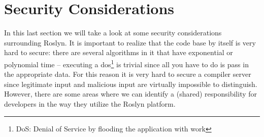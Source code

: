 \section{Security Considerations}
\label{sec:security}

In this last section we will take a look at some security considerations surrounding Roslyn. It is important to realize that the code base by itself is very hard to secure: there are several algorithms in it that have exponential or polynomial time -- executing a \gls{dos}\footnote{DoS: Denial of Service by flooding the application with work} is trivial since all you have to do is pass in the appropriate data. For this reason it is very hard to secure a compiler server\parencite{Gocke2015} since legitimate input and malicious input are virtually impossible to distinguish. However, there are some areas where we can identify a (shared) responsibility for developers in the way they utilize the Roslyn platform.


